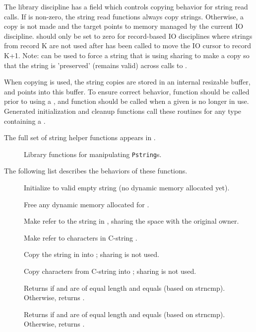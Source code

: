 The library discipline has a field  which controls
copying behavior for string read calls.  If  is
non-zero, the string read functions always copy strings. Otherwise, a
copy is not made and the target  points to memory managed by
the current IO discipline.   should only be set to
zero for record-based IO disciplines where strings from record K are
not used after  has been called to move the IO cursor
to record K+1.  Note:  can be used to force
a string that is using sharing to make a copy so that the string is
'preserved' (remains valid) across calls to .

When copying is used, the string copies are stored in an internal
resizable buffer, and  points into this buffer. 
To ensure correct behavior, function  should be called
prior to using a , and function  should
be called when a given  is no longer in use.
Generated initialization and cleanup functions call these routines for
any \pads{} type containing a .

The full set of string helper functions appears in .
\begin{figure}
\caption{Library functions for manipulating \texttt{Pstring}s.}
\label{fig:string-functions}
\end{figure}

The following list describes the behaviors of these functions.
\begin{description}
\item[] 
  Initialize  to valid empty string (no dynamic memory allocated yet).
\item[] 
  Free any dynamic memory allocated for .
\item[] 
  Make  refer to the string in , sharing the space with the original owner.
\item[] 
  Make  refer to  characters in C-string .
\item[]
  Copy the string in  into ; sharing is not used.
\item[] 
 Copy  characters from C-string  into ; sharing is not used.
\item[] 
 Returns  if  and  are of equal length and
  equals  (based on strncmp). Otherwise, returns .
\item[]
 Returns  if  and  are of equal length and
  equals  (based on strncmp). Otherwise, returns .
\end{description}

